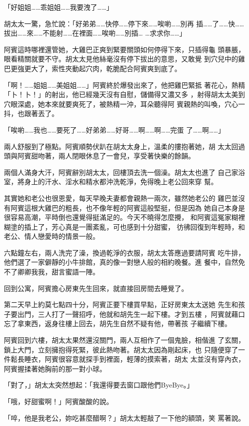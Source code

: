 「好姐姐……乖姐姐……我要洩了……」

胡太太一驚，急忙說：「好弟弟……快停……停下來……唉喲……別再
插……了……快……拔出……來……不能射……在裡面……唉喲……別插…
…求求你……」

阿賓這時哪裡還管她，大雞巴正爽到緊要關頭如何停得下來，只插得龜
頭暴脹，眼看精關就要不守。胡太太見他絲毫沒有停下拔出的意思，又敢覺
到穴兒中的雞巴更強更大了，索性夾動起穴肉，乾脆配合阿賓爽到底了。

「啊！……姐姐……美姐姐……」阿賓終於爆發出來了，他把雞巴緊抵
著花心，熱精「卜！卜！」的射出，他已經幾天沒有自慰，儲備得又濃又多
，射得胡太太美到穴眼深處，她本來就要爽死了，被熱精一沖，耳朵聽得阿
賓親熱的叫喚，穴心一抖，也跟著丟了。

「唉喲……我也……要死了……好弟弟……好哥……啊……啊……完蛋
了……啊……」

兩人舒服到了極點。阿賓順勢伏趴在胡太太身上，溫柔的摟抱著她，胡
太太回過頭與阿賓甜吻著，兩人閉眼休息了一會兒，享受著快樂的餘韻。

兩個人滿身大汗，阿賓辭別胡太太，回樓頂去洗一個澡。胡太太也進了
自己家浴室，將身上的汗水、淫水和精水都沖洗乾淨，免得晚上老公回來穿
幫。

其實她和老公也很恩愛，每天早晚夫妻都會親熱一兩次，雖然她老公的
雞巴並沒有阿賓這根大雞巴的粗長，也不像年輕的阿賓這般堅挺，但是因為
她自己本身是很容易高潮，平時倒也還覺得挺滿足的。今天不曉得怎麼攪，
和阿賓這冤家糊裡糊塗的插上了，芳心真是一團紊亂，可也感到十分甜蜜，
彷彿回復到年輕時，和老公、情人戀愛時的情景一般。

六點鐘左右，兩人洗完了澡，換過乾淨的衣服，胡太太答應過要請阿賓
吃牛排，他們選了一家僻靜的小牛排館，真的像一對戀人般的相約晚餐。進
餐中，自然免不了卿卿我我，甜言蜜語一陣。

回到公寓，阿賓擔心房東先生回來，就直接回房間去睡覺了。

第二天早上約莫七點四十分，阿賓正要下樓買早點，正好房東太太送她
先生和孩子要出門，三人打了一聲招呼，他就和胡先生一起下樓。才到五樓
，阿賓就藉口忘了拿東西，返身往樓上回去，胡先生自然不疑有他，帶著孩
子繼續下樓。

阿賓回到六樓，胡太太果然還沒關門，兩人互相作了一個鬼臉，相偕進
了玄關，鎖上大門，立刻擁抱得死緊，彼此熱吻著。胡太太因為剛起床，也
只隨便穿了一件鬆長睡衣，阿賓很容意就探手到裡面，輕薄的摸索著，胡太
太並沒有穿內衣，阿賓握揉著她胸前的那一對小球。

「對了，」胡太太突然想起：「我還得要去窗口跟他們ByeBye。」

「哦，好甜蜜啊！」阿賓酸酸的說。

「啐，他是我老公，妳吃甚麼醋啊？」胡太太輕敲了一下他的額頭，笑
罵著說。


